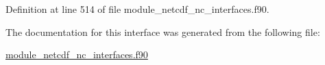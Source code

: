 Definition at line 514 of file module\+\_\+netcdf\+\_\+nc\+\_\+interfaces.\+f90.



The documentation for this interface was generated from the following file\+:\begin{DoxyCompactItemize}
\item 
\hyperlink{module__netcdf__nc__interfaces_8f90}{module\+\_\+netcdf\+\_\+nc\+\_\+interfaces.\+f90}\end{DoxyCompactItemize}
